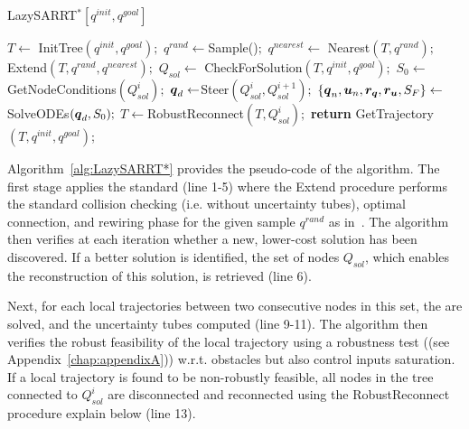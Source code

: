 \begin{algorithm}[h!]
    \caption{LazySARRT$^* [q^{init}, q^{goal}]$}\label{alg:LazySARRT*}
    \begin{algorithmic}[1]
        \State $T \gets$ InitTree$({q^{init}, q^{goal}});$
            \State $q^{rand} \gets $Sample()$;$
            \State $q^{nearest} \gets$ Nearest$(T,{q^{rand}});$
            \State Extend$(T, q^{rand}, q^{nearest});$
            \State $Q_{sol} \gets$ CheckForSolution$(T, q^{init}, q^{goal});$
                    \State $S_0 \gets $GetNodeConditions$(Q_{sol}^{i});$
                    \State $\boldsymbol{q}_d \gets $Steer$(Q_{sol}^{i}, Q_{sol}^{i+1});$
                    \State $\left \{\boldsymbol{q}_n, \boldsymbol{u}_n, \boldsymbol{r_q}, \boldsymbol{r_u}, S_F \right \}  \gets $SolveODEs$(\boldsymbol{q}_d, S_0);$
                        \State $T \gets $RobustReconnect$(T, Q_{sol}^{i});$
                    \EndIf
                \EndFor
            \EndIf
        \EndWhile
        \State \textbf{return} GetTrajectory$(T, q^{init}, q^{goal})$;
    \end{algorithmic}
\end{algorithm}

Algorithm~\ref{alg:LazySARRT*} provides the pseudo-code of the  algorithm.
The first stage applies the standard  (line 1-5) where the Extend procedure performs the standard collision checking (i.e. without uncertainty tubes), optimal connection, and rewiring phase for the given sample  $q^{rand}$ as in~\cite{cRRTstar}.
The algorithm then verifies at each iteration whether a new, lower-cost solution has been discovered. 
If a better solution is identified, the set of nodes $Q_{sol}$, which enables the reconstruction of this solution, is retrieved (line 6).

Next, for each local trajectories between two consecutive nodes in this set, the  are solved, and the uncertainty tubes computed (line 9-11).
The algorithm then verifies the robust feasibility of the local trajectory using a robustness test ((see Appendix~\ref{chap:appendixA})) w.r.t. obstacles but also control inputs saturation. 
If a local trajectory is found to be non-robustly feasible, all nodes in the tree connected to $Q_{sol}^i$ are disconnected and reconnected using the RobustReconnect procedure explain below (line 13).

